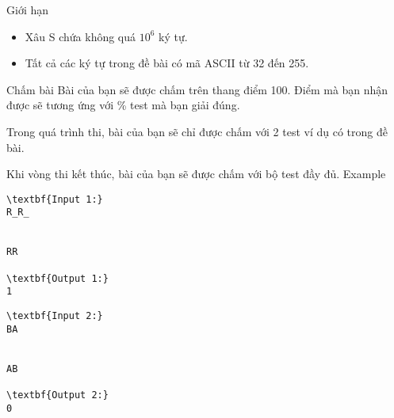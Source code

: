 Giới hạn
\begin{itemize}
	\item     Xâu S chứa không quá $10^{6}$    ký tự.   
	\item     Tất cả các ký tự trong đề bài có mã ASCII từ 32 đến 255.   
\end{itemize}
Chấm bài
Bài của bạn sẽ được chấm trên thang điểm 100. Điểm mà bạn nhận được sẽ tương ứng với \% test mà bạn giải đúng.  

   Trong quá trình thi, bài của bạn sẽ chỉ được chấm với 2 test ví dụ có trong đề bài.  

   Khi vòng thi kết thúc, bài của bạn sẽ được chấm với bộ test đầy đủ.
Example
\begin{verbatim}
\textbf{Input 1:}
R_R_


RR

\textbf{Output 1:}
1
\end{verbatim}
\begin{verbatim}
\textbf{Input 2:}
BA


AB

\textbf{Output 2:}
0\end{verbatim}